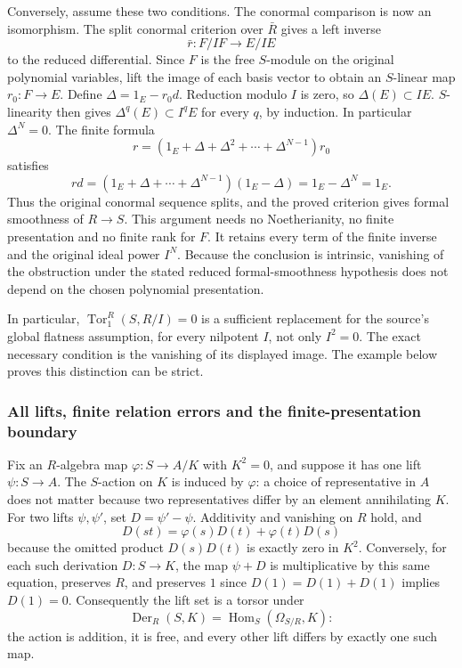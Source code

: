 Conversely, assume these two conditions. The conormal comparison is now an isomorphism. The split conormal criterion over \(\bar R\) gives a left inverse \[
\bar r:F/IF\longrightarrow E/IE
\] to the reduced differential. Since \(F\) is the free \(S\)-module on the original polynomial variables, lift the image of each basis vector to obtain an \(S\)-linear map \(r_0:F\to E\). Define \(\Delta=1_E-r_0d\). Reduction modulo \(I\) is zero, so \(\Delta(E)\subset IE\). \(S\)-linearity then gives \(\Delta^q(E)\subset I^qE\) for every \(q\), by induction. In particular \(\Delta^N=0\). The finite formula \[
r=(1_E+\Delta+\Delta^2+\cdots+\Delta^{N-1})r_0
\] satisfies \[
rd=(1_E+\Delta+\cdots+\Delta^{N-1})(1_E-\Delta)=1_E-\Delta^N=1_E.
\] Thus the original conormal sequence splits, and the proved criterion gives formal smoothness of \(R\to S\). This argument needs no Noetherianity, no finite presentation and no finite rank for \(F\). It retains every term of the finite inverse and the original ideal power \(I^N\). Because the conclusion is intrinsic, vanishing of the obstruction under the stated reduced formal-smoothness hypothesis does not depend on the chosen polynomial presentation.

In particular, \(\operatorname{Tor}_1^R(S,R/I)=0\) is a sufficient replacement for the source's global flatness assumption, for every nilpotent \(I\), not only \(I^2=0\). The exact necessary condition is the vanishing of its displayed image. The example below proves this distinction can be strict.

\subsubsection{All lifts, finite relation errors and the finite-presentation boundary}\label{all-lifts-finite-relation-errors-and-the-finite-presentation-boundary}

Fix an \(R\)-algebra map \(\varphi:S\to A/K\) with \(K^2=0\), and suppose it has one lift \(\psi:S\to A\). The \(S\)-action on \(K\) is induced by \(\varphi\): a choice of representative in \(A\) does not matter because two representatives differ by an element annihilating \(K\). For two lifts \(\psi,\psi'\), set \(D=\psi'-\psi\). Additivity and vanishing on \(R\) hold, and \[
D(st)=\varphi(s)D(t)+\varphi(t)D(s)
\] because the omitted product \(D(s)D(t)\) is exactly zero in \(K^2\). Conversely, for each such derivation \(D:S\to K\), the map \(\psi+D\) is multiplicative by this same equation, preserves \(R\), and preserves \(1\) since \(D(1)=D(1)+D(1)\) implies \(D(1)=0\). Consequently the lift set is a torsor under \[
\operatorname{Der}_R(S,K)=\operatorname{Hom}_S(\Omega_{S/R},K):
\] the action is addition, it is free, and every other lift differs by exactly one such map.

